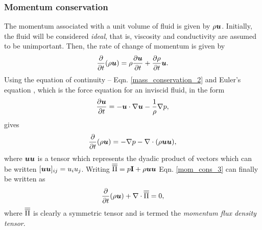 \subsubsection{Momentum conservation} 
The momentum associated with a unit volume of fluid is given by $\rho{\mbox{\boldmath$u$}}$. Initially, the fluid will be considered \textit{ideal}, that is, viscosity and conductivity are assumed to be unimportant. Then, the rate of change of momentum is given by
\begin{equation}\label{mom_cons_1}
 \frac{\partial}{\partial{t}}(\rho{\mbox{\boldmath$u$}})=\rho\frac{\partial{\mbox{\boldmath$u$}}}{\partial{t}}+\frac{\partial\rho}{\partial{t}}{\mbox{\boldmath$u$}}.
\end{equation}
Using the equation of continuity -- Eqn. \ref{mass_conservation_2} and Euler's equation \citep{batchelor_1967,ferziger_2002}, which is the force equation for an inviscid fluid, in the form
\begin{equation}\label{mom_cons_2}
 \frac{\partial{\mbox{\boldmath$u$}}}{\partial{t}}=-{\mbox{\boldmath$u$}}\cdot\nabla{\mbox{\boldmath$u$}}-\frac{1}{\rho}\nabla{p},
\end{equation}
gives
\begin{equation}\label{mom_cons_3}
 \frac{\partial}{\partial{t}}(\rho{\mbox{\boldmath$u$}})=-\nabla{p}-\nabla\cdot(\rho{\mbox{\boldmath$u$}}{\mbox{\boldmath$u$}}),
\end{equation}
where ${\mbox{\boldmath$u$}}{\mbox{\boldmath$u$}}$ is a tensor which represents the dyadic product of vectors which can be written $[{\mbox{\boldmath$u$}}{\mbox{\boldmath$u$}}]_{ij}=u_{i}u_{j}$. Writing $\overline{\overline{\Pi}}=p\mathbf{I}+\rho{\mbox{\boldmath$u$}}{\mbox{\boldmath$u$}}$ Eqn. \ref{mom_cons_3} can finally be written as
\begin{equation}\label{mom_cons_4}
 \frac{\partial}{\partial{t}}(\rho{\mbox{\boldmath$u$}})+\nabla\cdot\overline{\overline{\Pi}}=0,
\end{equation}
where $\overline{\overline{\Pi}}$ is clearly a symmetric tensor and is termed the \textit{momentum flux density tensor}.

